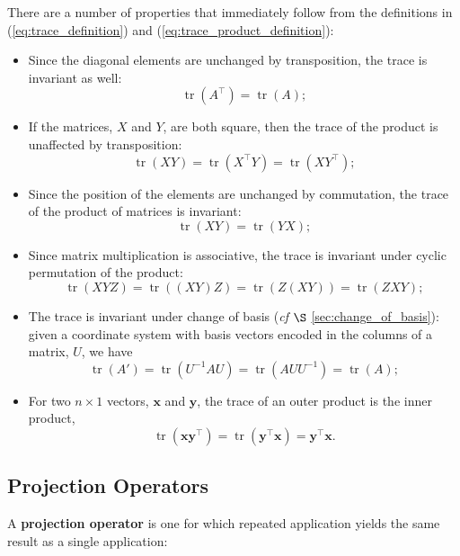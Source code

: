 \documentclass[12pt, twoside, draft]{article}
\begin{document}
There are a number of properties that immediately follow from the definitions in (\ref{eq:trace_definition}) and (\ref{eq:trace_product_definition}):
\begin{itemize}
\item Since the diagonal elements are unchanged by transposition, the trace is invariant as well:
\begin{equation} \operatorname{tr}(A^\top) = \operatorname{tr}(A); \end{equation}
\item If the matrices, $X$ and $Y$, are both square, then the trace of the product is unaffected by transposition:
\begin{equation} \operatorname{tr}(XY) = \operatorname{tr}(X^\top Y) = \operatorname{tr}(X Y^\top); \end{equation} 
\item Since the position of the elements are unchanged by commutation, the trace of the product of matrices is invariant:
\begin{equation} \operatorname{tr}(XY) = \operatorname{tr}(YX); \end{equation}
\item Since matrix multiplication is associative, the trace is invariant under cyclic permutation of the product:
\begin{equation} \operatorname{tr}(XYZ) = \operatorname{tr}((XY)Z) = \operatorname{tr}(Z(XY)) = \operatorname{tr}(ZXY); \end{equation}
\item The trace is invariant under change of basis (\textit{cf} $\S$ \ref{sec:change_of_basis}): given a coordinate system with basis vectors encoded in the columns of a matrix, $U$, we have
\begin{equation} \operatorname{tr}(A') = \operatorname{tr}(U^{-1}AU) = \operatorname{tr}(AUU^{-1}) = \operatorname{tr}(A); \end{equation}
\item For two $n \times 1$ vectors, $\mathbf{x}$ and $\mathbf{y}$, the trace of an outer product is the inner product,
\begin{equation} \operatorname{tr}(\mathbf{x} \mathbf{y}^\top) = \operatorname{tr}(\mathbf{y}^\top \mathbf{x}) = \mathbf{y}^\top \mathbf{x}. \end{equation}

\end{itemize}


\subsection{Projection Operators}\label{sec:projection-operators}
A \textbf{projection operator} is one for which repeated application yields the same result as a single application:
\end{document}
